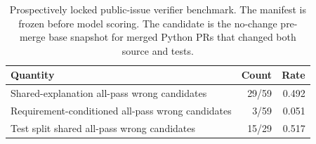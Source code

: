 \begin{table}[H]
\centering
\caption{Prospectively locked public-issue verifier benchmark. The manifest is frozen before model scoring. The candidate is the no-change pre-merge base snapshot for merged Python PRs that changed both source and tests.}
\label{tab:prospective-issue-benchmark}
\small
\begin{tabular}{@{}lrr@{}}
\toprule
Quantity & Count & Rate \\
\midrule
Shared-explanation all-pass wrong candidates & 29/59 & 0.492 \\
Requirement-conditioned all-pass wrong candidates & 3/59 & 0.051 \\
Test split shared all-pass wrong candidates & 15/29 & 0.517 \\
\bottomrule
\end{tabular}
\end{table}

